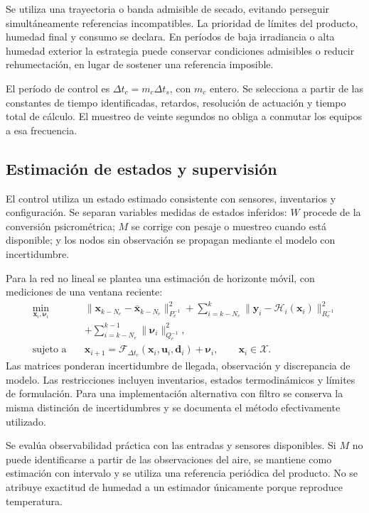 Se utiliza una trayectoria o banda admisible de secado, evitando perseguir simultáneamente referencias incompatibles. La prioridad de límites del producto, humedad final y consumo se declara. En períodos de baja irradiancia o alta humedad exterior la estrategia puede conservar condiciones admisibles o reducir rehumectación, en lugar de sostener una referencia imposible.

El período de control es $\Delta t_c=m_c\Delta t_s$, con $m_c$ entero. Se selecciona a partir de las constantes de tiempo identificadas, retardos, resolución de actuación y tiempo total de cálculo. El muestreo de veinte segundos no obliga a conmutar los equipos a esa frecuencia.

\subsection{Estimación de estados y supervisión}
\label{met:estimacion}

El control utiliza un estado estimado consistente con sensores, inventarios y configuración. Se separan variables medidas de estados inferidos: $W$ procede de la conversión psicrométrica; $M$ se corrige con pesaje o muestreo cuando está disponible; y los nodos sin observación se propagan mediante el modelo con incertidumbre.

Para la red no lineal se plantea una estimación de horizonte móvil, con mediciones de una ventana reciente:
\begin{equation}
\begin{split}
\min_{\mathbf x_i,\boldsymbol\nu_i}\quad&
\|\mathbf x_{k-N_e}-\bar{\mathbf x}_{k-N_e}\|_{P_e^{-1}}^2
+\sum_{i=k-N_e}^{k}\|
\mathbf y_i-\mathcal H_i(\mathbf x_i)
\|_{R_e^{-1}}^2\\
&+\sum_{i=k-N_e}^{k-1}\|\boldsymbol\nu_i\|_{Q_e^{-1}}^2,\\
\text{sujeto a}\quad&
\mathbf x_{i+1}=\mathcal F_{\Delta t_c}
(\mathbf x_i,\mathbf u_i,\mathbf d_i)+\boldsymbol\nu_i,
\qquad \mathbf x_i\in\mathcal X.
\end{split}
\label{met:mhe}
\end{equation}
Las matrices ponderan incertidumbre de llegada, observación y discrepancia de modelo. Las restricciones incluyen inventarios, estados termodinámicos y límites de formulación. Para una implementación alternativa con filtro se conserva la misma distinción de incertidumbres y se documenta el método efectivamente utilizado.

Se evalúa observabilidad práctica con las entradas y sensores disponibles. Si $M$ no puede identificarse a partir de las observaciones del aire, se mantiene como estimación con intervalo y se utiliza una referencia periódica del producto. No se atribuye exactitud de humedad a un estimador únicamente porque reproduce temperatura.

